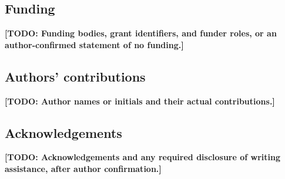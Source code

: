 \documentclass[pdflatex,sn-vancouver-num]{sn-jnl}
\newcommand{\TODO}[1]{\textbf{[TODO: #1]}}
\begin{document}
\subsection*{Funding}
\TODO{Funding bodies, grant identifiers, and funder roles,
or an author-confirmed statement of no funding.}

\subsection*{Authors' contributions}
\TODO{Author names or initials and their actual contributions.}

\subsection*{Acknowledgements}
\TODO{Acknowledgements and any required disclosure of writing
assistance, after author confirmation.}

\clearpage

\end{document}
